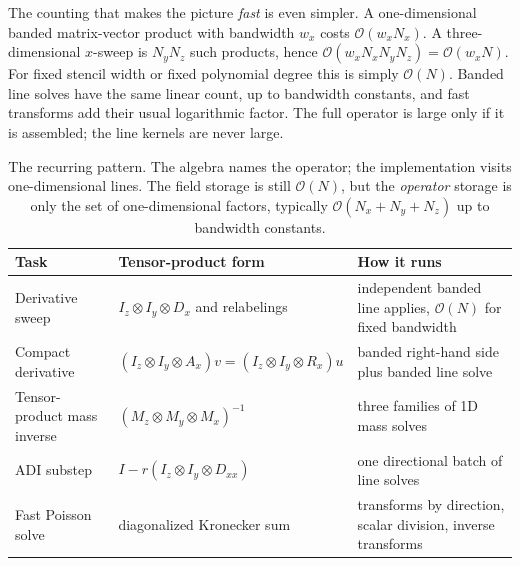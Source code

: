 \documentclass[11pt]{article}
\newcommand{\kron}{\otimes}
\newcommand{\bigO}{\mathcal{O}}
\newcommand{\Nall}{N}
\begin{document}
The counting that makes the picture \emph{fast} is even simpler.  A
one-dimensional banded matrix-vector product with bandwidth $w_x$
costs $\bigO(w_xN_x)$.  A three-dimensional $x$-sweep is $N_yN_z$
such products, hence $\bigO(w_xN_xN_yN_z)=\bigO(w_x\Nall)$.  For
fixed stencil width or fixed polynomial degree this is simply
$\bigO(\Nall)$.  Banded line solves have the same linear count, up to
bandwidth constants, and fast transforms add their usual logarithmic
factor.  The full operator is large only if it is assembled; the line
kernels are never large.

\begin{table}[t]
\centering
\footnotesize
\renewcommand{\arraystretch}{1.2}
\begin{tabular}{@{}p{}p{}p{}@{}}
\toprule
\textbf{Task} & \textbf{Tensor-product form} & \textbf{How it runs} \\
\midrule
Derivative sweep & $I_z\kron I_y\kron D_x$ and relabelings & independent banded line applies, $\bigO(\Nall)$ for fixed bandwidth \\
\addlinespace[3pt]
Compact derivative & $(I_z\kron I_y\kron A_x)v=(I_z\kron I_y\kron R_x)u$ & banded right-hand side plus banded line solve \\
\addlinespace[3pt]
Tensor-product mass inverse & $(M_z\kron M_y\kron M_x)^{-1}$ & three families of 1D mass solves \\
\addlinespace[3pt]
ADI substep & $I-r(I_z\kron I_y\kron D_{xx})$ & one directional batch of line solves \\
\addlinespace[3pt]
Fast Poisson solve & diagonalized Kronecker sum & transforms by direction, scalar division, inverse transforms \\
\bottomrule
\end{tabular}
\caption{The recurring pattern.  The algebra names the operator; the
implementation visits one-dimensional lines.  The field storage is
still $\bigO(\Nall)$, but the \emph{operator} storage is only the set
of one-dimensional factors, typically $\bigO(N_x+N_y+N_z)$ up to
bandwidth constants.}
\label{tab:pattern}
\end{table}
\end{document}
